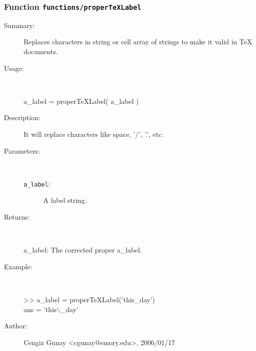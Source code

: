 \subsubsection[Function \texttt{properTeXLabel}]{Function \texttt{functions/properTeXLabel}}%
%
\label{ref_functions__properTeXLabel}%
\hypertarget{ref_functions__properTeXLabel}{}%
\begin{description}
\item[Summary:]Replaces characters in string or cell array of strings to make it valid in TeX documents.
%
\item[Usage:]~%
\begin{lyxcode}%
a\_label = properTeXLabel( a\_label )
%
\end{lyxcode}%
%
\item[Description:]%
It will replace characters like space, '/', '.', etc.
\item[Parameters:]~
\begin{description}%
\item[\texttt{a\_label}:]
 A label string.
\end{description}%
%
\item[Returns:]~

 	a\_label: The corrected proper a\_label.
%
\item[Example:]~
\begin{lyxcode} >> a\_label = properTeXLabel('this\_day')\\%
 ans = 'this$\backslash$\_day' \\%
\end{lyxcode}
%
%
\item[Author:]%
Cengiz Gunay <cgunay@emory.edu>, 2006/01/17%
\end{description}
\methodline%

